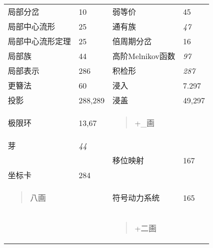 \documentclass{article}
\begin{document}
\begin{longtable}[]{@{}llll@{}}
局部分岔 & 10 & 弱等价 & 45\tabularnewline
局部中心流形 & 25 & 通有族 & \emph{47}\tabularnewline
局部中心流形定理 & 25 & 倍周期分岔 & 16\tabularnewline
局部族 & 44 & 高阶Melnikov函数 & \emph{97}\tabularnewline
局部表示 & 286 & 积检形 & \emph{287}\tabularnewline
更簪法 & 60 & 浸入 & 7.297\tabularnewline
投影 & 288,289 & 浸盖 & 49,297\tabularnewline
\begin{minipage}[t]{0.22\columnwidth}\raggedright
极限环\strut
\end{minipage} & \begin{minipage}[t]{0.22\columnwidth}\raggedright
13,67\strut
\end{minipage} & \begin{minipage}[t]{0.22\columnwidth}\raggedright
\begin{quote}
+\_画
\end{quote}\strut
\end{minipage} & \begin{minipage}[t]{0.22\columnwidth}\raggedright
\strut
\end{minipage}\tabularnewline
芽 & \emph{44} & &\tabularnewline
& & 移位映射 & 167\tabularnewline
坐标卡 & 284 & &\tabularnewline
\begin{minipage}[t]{0.22\columnwidth}\raggedright
\begin{quote}
八画
\end{quote}\strut
\end{minipage} & \begin{minipage}[t]{0.22\columnwidth}\raggedright
\strut
\end{minipage} & \begin{minipage}[t]{0.22\columnwidth}\raggedright
符号动力系统\strut
\end{minipage} & \begin{minipage}[t]{0.22\columnwidth}\raggedright
165\strut
\end{minipage}\tabularnewline
\begin{minipage}[t]{0.22\columnwidth}\raggedright
\strut
\end{minipage} & \begin{minipage}[t]{0.22\columnwidth}\raggedright
\strut
\end{minipage} & \begin{minipage}[t]{0.22\columnwidth}\raggedright
\begin{quote}
+二画
\end{quote}\strut
\end{minipage} & \begin{minipage}[t]{0.22\columnwidth}\raggedright

\end{minipage}
\end{longtable}
\end{document}
